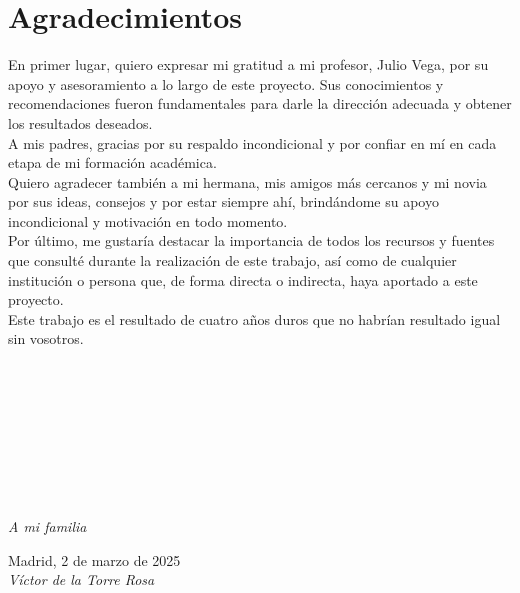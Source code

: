 \cleardoublepage

\chapter*{Agradecimientos}

En primer lugar, quiero expresar mi gratitud a mi profesor, Julio Vega, por su apoyo y asesoramiento a lo largo de este proyecto. Sus conocimientos y recomendaciones fueron fundamentales para darle la dirección adecuada y obtener los resultados deseados.\\

A mis padres, gracias por su respaldo incondicional y por confiar en mí en cada etapa de mi formación académica.\\

Quiero agradecer también a mi hermana, mis amigos más cercanos y mi novia por sus ideas, consejos y por estar siempre ahí, brindándome su apoyo incondicional y motivación en todo momento.\\

Por último, me gustaría destacar la importancia de todos los recursos y fuentes que consulté durante la realización de este trabajo, así como de cualquier institución o persona que, de forma directa o indirecta, haya aportado a este proyecto.\\

Este trabajo es el resultado de cuatro años duros que no habrían resultado igual sin vosotros.\\
\ %

\

\

\

\

\begin{flushright}
		\vspace{4.0 cm}
		\emph{A mi familia}\\
		\par
		\vspace{1.0 cm}
		Madrid, 2 de marzo de 2025\\ %
		\emph{Víctor de la Torre Rosa}
\end{flushright}

\thispagestyle{empty}

